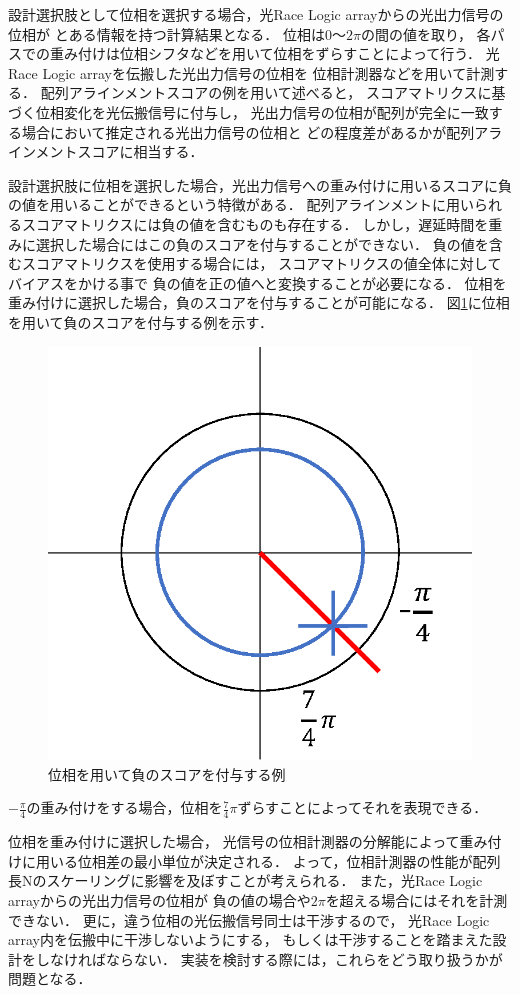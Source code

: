 設計選択肢として位相を選択する場合，光Race Logic arrayからの光出力信号の位相が
とある情報を持つ計算結果となる．
位相は$0〜2\pi$の間の値を取り，
各パスでの重み付けは位相シフタなどを用いて位相をずらすことによって行う．
光Race Logic arrayを伝搬した光出力信号の位相を
位相計測器などを用いて計測する．
配列アラインメントスコアの例を用いて述べると，
スコアマトリクスに基づく位相変化を光伝搬信号に付与し，
光出力信号の位相が配列が完全に一致する場合において推定される光出力信号の位相と
どの程度差があるかが配列アラインメントスコアに相当する．

設計選択肢に位相を選択した場合，光出力信号への重み付けに用いるスコアに負の値を用いることができるという特徴がある．
配列アラインメントに用いられるスコアマトリクスには負の値を含むものも存在する．
しかし，遅延時間を重みに選択した場合にはこの負のスコアを付与することができない．
負の値を含むスコアマトリクスを使用する場合には，
スコアマトリクスの値全体に対してバイアスをかける事で
負の値を正の値へと変換することが必要になる．
位相を重み付けに選択した場合，負のスコアを付与することが可能になる．
図\ref{fig:isou}に位相を用いて負のスコアを付与する例を示す．
\begin{figure}[t!]
\begin{center}
\includegraphics[keepaspectratio,scale=0.5]{fig/5/isou.eps}
\caption{位相を用いて負のスコアを付与する例}
\label{fig:isou}
\end{center}
\end{figure}
$-\frac{\pi}{4}$の重み付けをする場合，位相を$\frac{7}{4}\pi$ずらすことによってそれを表現できる．

位相を重み付けに選択した場合，
光信号の位相計測器の分解能によって重み付けに用いる位相差の最小単位が決定される．
よって，位相計測器の性能が配列長Nのスケーリングに影響を及ぼすことが考えられる．
また，光Race Logic arrayからの光出力信号の位相が
負の値の場合や$2\pi$を超える場合にはそれを計測できない．
更に，違う位相の光伝搬信号同士は干渉するので，
光Race Logic array内を伝搬中に干渉しないようにする，
もしくは干渉することを踏まえた設計をしなければならない．
実装を検討する際には，これらをどう取り扱うかが問題となる．
